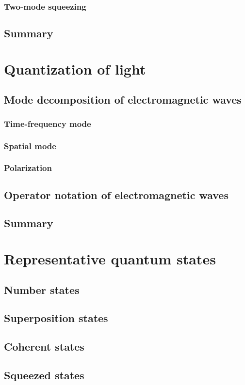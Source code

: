 \documentclass{book}
\begin{document}
\subsection{Two-mode squeezing}
\section{Summary}

\chapter{Quantization of light}
\section{Mode decomposition of electromagnetic waves}
\subsection{Time-frequency mode}
\subsection{Spatial mode}
\subsection{Polarization}
\section{Operator notation of electromagnetic waves}
\section{Summary}

\chapter{Representative quantum states}
\section{Number states}
\section{Superposition states}
\section{Coherent states}
\section{Squeezed states}
\end{document}
